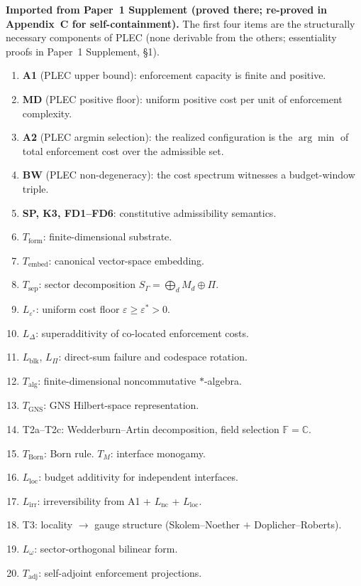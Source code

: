 \documentclass[11pt,a4paper]{article}
\theoremstyle{definition}
\newcommand{\eps}{\varepsilon}
\begin{document}

\medskip
\begin{tcolorbox}[apfbox, title={What Is Assumed, What Is Proved, What Is Deferred}]

\textbf{Imported from Paper~1 Supplement (proved there; re-proved in Appendix~C for self-containment).}  The first four items are the structurally necessary components of PLEC (none derivable from the others; essentiality proofs in Paper~1 Supplement, \S1).
\begin{enumerate}[nosep,label=\arabic*.,leftmargin=2em]
  \item \textbf{A1} (PLEC upper bound): enforcement capacity is finite and positive.
  \item \textbf{MD} (PLEC positive floor): uniform positive cost per unit of enforcement complexity.
  \item \textbf{A2} (PLEC argmin selection): the realized configuration is the $\arg\min$ of total enforcement cost over the admissible set.
  \item \textbf{BW} (PLEC non-degeneracy): the cost spectrum witnesses a budget-window triple.
  \item \textbf{SP, K3, FD1--FD6}: constitutive admissibility semantics.
  \item $T_{\mathrm{form}}$: finite-dimensional substrate.
  \item $T_{\mathrm{embed}}$: canonical vector-space embedding.
  \item $T_{\mathrm{sep}}$: sector decomposition $S_\Gamma = \bigoplus_d M_d \oplus \Pi$.
  \item $L_{\eps^*}$: uniform cost floor $\eps \ge \eps^* > 0$.
  \item $L_\Delta$: superadditivity of co-located enforcement costs.
  \item $L_{\mathrm{blk}}$, $L_\Pi$: direct-sum failure and codespace rotation.
  \item $T_{\mathrm{alg}}$: finite-dimensional noncommutative $*$-algebra.
  \item $T_{\mathrm{GNS}}$: GNS Hilbert-space representation.
  \item T2a--T2c: Wedderburn--Artin decomposition, field selection $\mathbb{F} = \mathbb{C}$.
  \item $T_{\mathrm{Born}}$: Born rule.  $T_M$: interface monogamy.
  \item $L_{\mathrm{loc}}$: budget additivity for independent interfaces.
  \item $L_{\mathrm{irr}}$: irreversibility from A1 + $L_{\mathrm{nc}}$ + $L_{\mathrm{loc}}$.
  \item T3: locality $\to$ gauge structure (Skolem--Noether $+$ Doplicher--Roberts).
  \item $L_\omega$: sector-orthogonal bilinear form.
  \item $T_{\mathrm{adj}}$: self-adjoint enforcement projections.
\end{enumerate}


\end{tcolorbox}
\end{document}
